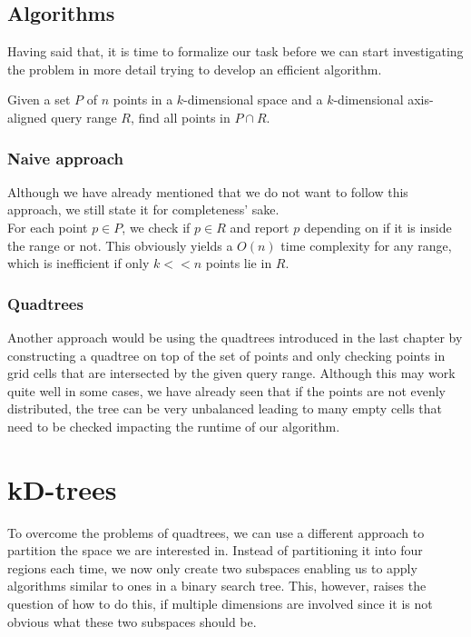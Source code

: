     \subsection{Algorithms}
        Having said that, it is time to formalize our task before we can start investigating the problem in more detail trying to develop an efficient algorithm. 
        \begin{mdframed}
        Given a set $P$ of $n$ points in a $k$-dimensional  space and a $k$-dimensional axis-aligned query range $R$, find all points in $P \cap R$.
        \end{mdframed}

        \subsubsection{Naive approach}
            Although we have already mentioned that we do not want to follow this approach, we still state it for completeness' sake. \\
            For each point $p \in P$, we check if $p \in R$ and report $p$ depending on if it is inside the range or not. This obviously yields a $O(n)$ time complexity for any range, which is inefficient if only $k << n$ points lie in $R$. 

        \subsubsection{Quadtrees}
            Another approach would be using the quadtrees introduced in the last chapter by constructing a quadtree on top of the set of points and only checking points in grid cells that are intersected by the given query range. Although this may work quite well in some cases, we have already seen that if the points are not evenly distributed, the tree can be very unbalanced leading to many empty cells that need to be checked impacting the runtime of our algorithm. 

\section{kD-trees}
    To overcome the problems of quadtrees, we can use a different approach to partition the space we are interested in. Instead of partitioning it into four regions each time, we now only create two subspaces enabling us to apply algorithms similar to ones in a binary search tree. This, however, raises the question of how to do this, if multiple dimensions are involved since it is not obvious what these two subspaces should be. 

